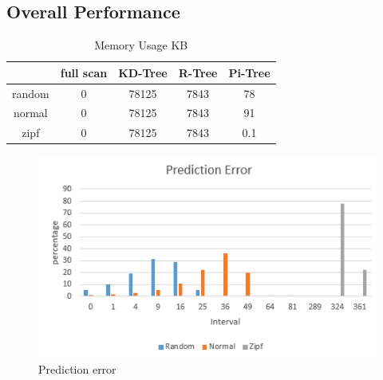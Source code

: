 \documentclass[sigconf,10pt]{acmart}
\begin{document}
\subsection{Overall Performance}

\begin{table}[h]
  \centering
  \begin{tabular}{|c|c|c|c|c|}
    \hline
          & full scan & KD-Tree & R-Tree & Pi-Tree \\
    \hline
    random & 0 & 78125 & 7843 & 78 \\
    \hline
    normal & 0 & 78125 & 7843 & 91 \\
    \hline
    zipf & 0 & 78125 & 7843 & 0.1 \\
    \hline 
  \end{tabular}
  \caption{Memory Usage KB}
  \label{table:mem}
\end{table}

\begin{figure}[h]
  \includegraphics[scale=0.6]{../figures/addition/prediction-error}
  \caption{Prediction error}
  \label{prediction-error}
\end{figure}
\end{document}
